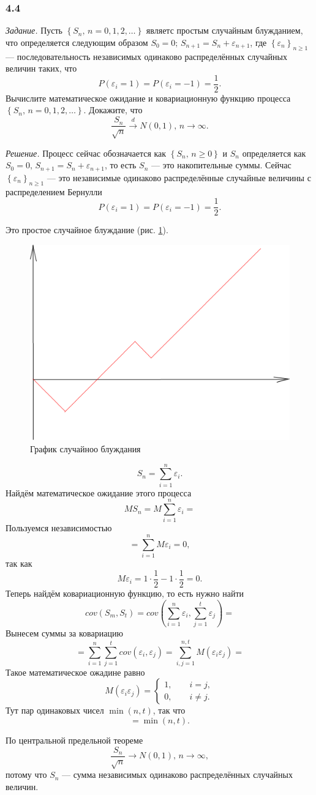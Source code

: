 \subsubsection*{4.4}

\textit{Задание.}
Пусть $ \left\{ S_n, \, n = 0, 1, 2, \dotsc \right\} $ являетс простым случайным блужданием,
что определяется следующим образом $S_0 = 0; \, S_{n + 1} = S_n + \varepsilon_{n + 1}$,
где $ \left\{ \varepsilon_n \right\}_{n \geq 1}$ ---
последовательность независимых одинаково распределённых случайных величин таких, что
$$P \left( \varepsilon_i = 1 \right) =
  P \left( \varepsilon_i = -1 \right) =
  \frac{1}{2}.$$
Вычислите математическое ожидание и ковариационную функцию процесса
$ \left\{ S_n, \, n = 0, 1, 2, \dotsc \right\} $.
Докажите, что
$$ \frac{S_n}{ \sqrt{n}} \overset{d}{ \to } N \left( 0, 1 \right), \,
  n \to \infty.$$

\textit{Решение.}
Процесс сейчас обозначается как $ \left\{ S_n, \, n \geq 0 \right\} $ и $S_n$ определяется как
$S_0 = 0, \, S_{n + 1} = S_n + \varepsilon_{n + 1}$, то есть $S_n$ --- это накопительные суммы.
Сейчас $ \left\{ \varepsilon_n \right\}_{n \geq 1}$ ---
это независимые одинаково распределённые случайные величины с распределением Бернулли
$$P \left( \varepsilon_i = 1 \right) =
  P \left( \varepsilon_i = -1 \right) =
  \frac{1}{2}.$$

Это простое случайное блуждание (рис. \ref{fig:44}).

\begin{figure}[h!]
  \centering
  \includegraphics[width=.4\textwidth]{./pictures/4_4.png}
  \caption{График случайноо блуждания}
  \label{fig:44}
\end{figure}

$$S_n =
  \sum \limits_{i = 1}^n \varepsilon_i.$$
Найдём математическое ожидание этого процесса
$$MS_n =
  M \sum \limits_{i = 1}^n \varepsilon_i =$$
Пользуемся независимостью
$$= \sum \limits_{i = 1}^n M \varepsilon_i =
  0,$$
так как
$$M \varepsilon_i =
  1 \cdot \frac{1}{2} - 1 \cdot \frac{1}{2} =
  0.$$
Теперь найдём ковариационную функцию, то есть нужно найти
$$cov \left( S_m, S_t \right) =
  cov \left( \sum \limits_{i = 1}^n \varepsilon_i, \sum \limits_{j = 1}^t \varepsilon_j \right) =$$
Вынесем суммы за ковариацию
$$= \sum \limits_{i = 1}^n \sum \limits_{j = 1}^t cov \left( \varepsilon_i, \varepsilon_j \right) =
\sum \limits_{i, j = 1}^{n, t} M \left( \varepsilon_i \varepsilon_j \right) =$$
Такое математическое ожадине равно
$$M \left( \varepsilon_i \varepsilon_j \right) =
  \begin{cases}
    1, \qquad i = j, \\
    0, \qquad i \neq j.
  \end{cases}$$
Тут пар одинаковых чисел $ \min \left( n, t \right) $, так что
$$= \min \left( n, t \right).$$

По центральной предельной теореме
$$ \frac{S_n}{ \sqrt{n}} \to N \left( 0, 1 \right), \,
  n \to \infty,$$
потому что $S_n$ --- сумма независимых одинаково распределённых случайных величин.
